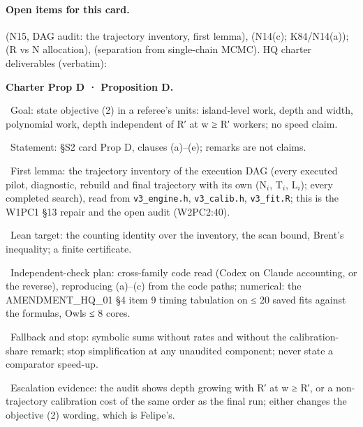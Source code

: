 \paragraph{Open items for this card.}  (N15, DAG audit: the trajectory inventory, first lemma),  (N14(c); K84/N14(a));  (R vs N allocation),  (separation from single-chain MCMC). HQ charter deliverables (verbatim):
\par\noindent \textbf{Charter Prop D · Proposition D.}
\par\noindent \textbullet~Goal: state objective (2) in a referee's units: island-level work, depth and width, polynomial work, depth independent of R′ at w ≥ R′ workers; no speed claim.
\par\noindent \textbullet~Statement: §S2 card Prop D, clauses (a)–(e); remarks are not claims.
\par\noindent \textbullet~First lemma: the trajectory inventory of the execution DAG (every executed pilot, diagnostic, rebuild and final trajectory with its own (N$_{i}$, T$_{i}$, L$_{i}$); every completed search), read from \texttt{v3\_engine.h}, \texttt{v3\_calib.h}, \texttt{v3\_fit.R}; this is the W1PC1 §13 repair and the open audit (W2PC2:40).
\par\noindent \textbullet~Lean target: the counting identity over the inventory, the scan bound, Brent's inequality; a finite certificate.
\par\noindent \textbullet~Independent-check plan: cross-family code read (Codex on Claude accounting, or the reverse), reproducing (a)–(c) from the code paths; numerical: the AMENDMENT\_HQ\_01 §4 item 9 timing tabulation on ≤ 20 saved fits against the formulas, Owls ≤ 8 cores.
\par\noindent \textbullet~Fallback and stop: symbolic sums without rates and without the calibration-share remark; stop simplification at any unaudited component; never state a comparator speed-up.
\par\noindent \textbullet~Escalation evidence: the audit shows depth growing with R′ at w ≥ R′, or a non-trajectory calibration cost of the same order as the final run; either changes the objective (2) wording, which is Felipe's.

